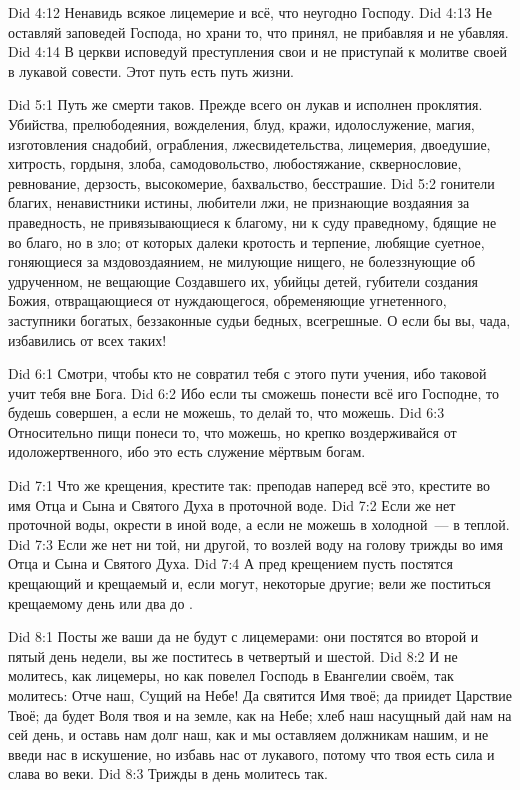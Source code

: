 \vs Did 4:12
Ненавидь всякое лицемерие и всё, что неугодно Господу.
\vs Did 4:13
Не оставляй заповедей Господа, но храни то, что принял,
не прибавляя и не убавляя.
\vs Did 4:14
В церкви исповедуй преступления свои и не приступай к молитве
своей в лукавой совести.
Этот путь есть путь жизни.

\vs Did 5:1
Путь же смерти таков.
Прежде всего он лукав и исполнен проклятия.
Убийства, прелюбодеяния, вожделения, блуд, кражи, идолослужение,
магия, изготовления снадобий, ограбления, лжесвидетельства, лицемерия,
двоедушие, хитрость, гордыня, злоба, самодовольство, любостяжание,
сквернословие, ревнование, дерзость, высокомерие, бахвальство, бесстрашие.
\vs Did 5:2
гонители благих, ненавистники истины, любители лжи,
не признающие воздаяния за праведность,
не привязывающиеся к благому, ни к суду праведному,
бдящие не во благо, но в зло; от которых далеки кротость и
терпение, любящие суетное, гоняющиеся за мздовоздаянием,
не милующие нищего, не болеззнующие об удрученном,
не вещающие Создавшего их, убийцы детей, губители создания Божия,
отвращающиеся от нуждающегося, обременяющие угнетенного,
заступники богатых, беззаконные судьи бедных, всегрешные.
О если бы вы, чада, избавились от всех таких!

\vs Did 6:1
Смотри, чтобы кто не совратил тебя с этого пути учения, ибо
таковой учит тебя вне Бога.
\vs Did 6:2
Ибо если ты сможешь понести всё иго Господне, то будешь
совершен, а если не можешь, то делай то, что можешь.
\vs Did 6:3
Относительно пищи понеси то, что можешь, но крепко
воздерживайся от идоложертвенного, ибо это есть служение
мёртвым богам.

\vs Did 7:1
Что же  крещения,
крестите так: преподав наперед всё это,
крестите во имя Отца и Сына и Святого Духа
в проточной воде.
\vs Did 7:2
Если же нет проточной воды, окрести в иной воде,
а если не можешь в холодной~--- в теплой.
\vs Did 7:3
Если же нет ни той, ни другой, то возлей воду на голову трижды
во имя Отца и Сына и Святого Духа.
\vs Did 7:4
А пред крещением пусть постятся крещающий и крещаемый и, если
могут, некоторые другие; вели же  поститься
крещаемому день или два до .

\vs Did 8:1
Посты же ваши да не будут с лицемерами:
они постятся во второй и пятый день недели,
вы же поститесь в четвертый и шестой.
\vs Did 8:2
И не молитесь, как лицемеры, но как повелел Господь в Евангелии своём,
так молитесь:
Отче наш, Cущий на Небе!
Да святится Имя твоё;
да приидет Царствие Твоё;
да будет Воля твоя и на земле, как на Небе;
хлеб наш насущный дай нам на сей день,
и оставь нам долг наш, как и мы оставляем должникам нашим,
и не введи нас в искушение,
но избавь нас от лукавого,
потому что твоя есть сила и слава во веки.
\vs Did 8:3
Трижды в день молитесь так.

